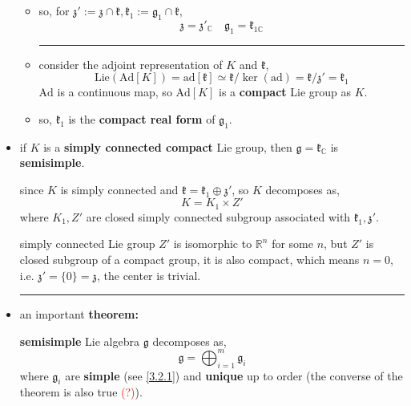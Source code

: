 \begin{itemize}
\begin{tcolorbox}[title=proof:]
\begin{itemize}
			\item so, for $\mathfrak{z}' := \mathfrak{z} \cap \mathfrak{k}, \mathfrak{k}_1 := \mathfrak{g}_1 \cap \mathfrak{k}$,
			\begin{equation}
				\mathfrak{z} = \mathfrak{z}'_\mathbb{C} \quad \mathfrak{g}_1 = \mathfrak{k}_{1 \mathbb{C}}
			\end{equation}
			
			\noindent\rule[0.5ex]{\linewidth}{0.5pt} %
			
			\item consider the adjoint representation of $K$ and $\mathfrak{k}$,
			\begin{equation}
				\mathrm{Lie}(\mathrm{Ad}[K]) = \mathrm{ad}[\mathfrak{k}] \simeq \mathfrak{k} / \ker(\mathrm{ad}) = \mathfrak{k} / \mathfrak{z}' = \mathfrak{k}_1
			\end{equation}
			$\mathrm{Ad}$ is a continuous map, so $\mathrm{Ad}[K]$ is a \textbf{compact} Lie group as $K$.
			
			\item so, $\mathfrak{k}_1$ is the \textbf{compact real form} of $\mathfrak{g}_1$.
		\end{itemize}
	\end{tcolorbox}
	
	\item if $K$ is a \textbf{simply connected compact} Lie group, then $\mathfrak{g} = \mathfrak{k}_\mathbb{C}$ is \textbf{semisimple}.
	
	\begin{tcolorbox}[title=proof:]
		since $K$ is simply connected and $\mathfrak{k} = \mathfrak{k}_1 \oplus \mathfrak{z}'$, so $K$ decomposes as,
		\begin{equation}
			K = K_1 \times Z'
		\end{equation}
		where $K_1, Z'$ are closed simply connected subgroup associated with $\mathfrak{k}_1, \mathfrak{z}'$.
		
		simply connected Lie group $Z'$ is isomorphic to $\mathbb{R}^n$ for some $n$, but $Z'$ is closed subgroup of a compact group, it is also compact, which means $n = 0$, i.e. $\mathfrak{z}' = \{0\} = \mathfrak{z}$, the center is trivial.
	\end{tcolorbox}
	
	\noindent\rule[0.5ex]{\linewidth}{0.5pt} %
	
	\item an important \textbf{theorem:}
	
	\textbf{semisimple} Lie algebra $\mathfrak{g}$ decomposes as,
	\begin{equation} \label{6.1.13}
		\mathfrak{g} = \bigoplus_{i = 1}^m \mathfrak{g}_i
	\end{equation}
	where $\mathfrak{g}_i$ are \textbf{simple} (see \ref{3.2.1}) and \textbf{unique} up to order (the converse of the theorem is also true \textcolor{red}{(?)}).
	

\end{itemize}

